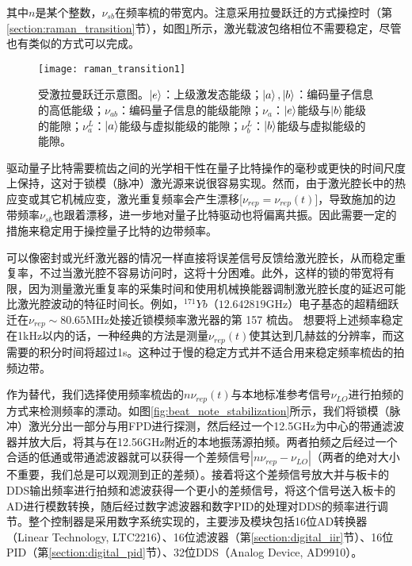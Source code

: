 其中$n$是某个整数，$\nu_{sb}$在频率梳的带宽内。注意采用拉曼跃迁的方式操控时（第\ref{section:raman_transition}节），如图\ref{fig:raman_transition1}所示，激光载波包络相位不需要稳定\cite[]{Peer_Shapiro_Stowe_Shapiro_Ye_2007}，尽管也有类似的方式可以完成\cite[]{Koke_Grebing_Frei_Anderson_Assion_Steinmeyer_2010}。

\begin{figure}
    \centering
    \caption[受激拉曼跃迁示意图]{受激拉曼跃迁示意图。$\ket{e}$：上级激发态能级；$\ket{a},\ket{b}$：编码量子信息的高低能级；$\nu_{ab}$：编码量子信息的能级能隙；$\nu_{a}$：$\ket{e}$能级与$\ket{b}$能级的能隙；$\nu_a^L$：$\ket{a}$能级与虚拟能级的能隙；$\nu_b^L$：$\ket{b}$能级与虚拟能级的能隙。\label{fig:raman_transition1}}
    \texttt{[image: raman\_transition1]}
\end{figure}

驱动量子比特需要梳齿之间的光学相干性在量子比特操作的毫秒或更快的时间尺度上保持，这对于锁模（脉冲）激光源来说很容易实现\cite[]{Hayes_Matsukevich_Maunz_Hucul_Quraishi_Olmschenk_Campbell_Mizrahi_Senko_Monroe_2010}。然而，由于激光腔长中的热应变或其它机械应变，激光重复频率会产生漂移[$\nu_{rep}=\nu_{rep}(t)$]，导致施加的边带频率$\nu_{sb}$也跟着漂移，进一步地对量子比特驱动也将偏离共振。因此需要一定的措施来稳定用于操控量子比特的边带频率。

可以像密封或光纤激光器的情况一样直接将误差信号反馈给激光腔长，从而稳定重复率，不过当激光腔不容易访问时，这将十分困难。此外，这样的锁的带宽将有限，因为测量激光重复率的采集时间和使用机械换能器调制激光腔长度的延迟可能比激光腔波动的特征时间长。例如，$^{171}Yb$（$12.642819 $GHz）电子基态的超精细跃迁在$ \nu_{rep} \sim 80.65$MHz处接近锁模频率激光器的第 157 梳齿。
想要将上述频率稳定在1kHz以内的话，一种经典的方法是测量$\nu_{rep}(t)$使其达到几赫兹的分辨率，而这需要的积分时间将超过1s。这种过于慢的稳定方式并不适合用来稳定频率梳齿的拍频边带。

作为替代，我们选择使用频率梳齿的$n\nu_{rep}(t)$与本地标准参考信号$\nu_{LO}$进行拍频的方式来检测频率的漂动。如图\ref{fig:beat_note_stabilization}所示，我们将锁模（脉冲）激光分出一部分与用FPD进行探测，然后经过一个12.5GHz为中心的带通滤波器并放大后，将其与在12.56GHz附近的本地振荡源拍频。两者拍频之后经过一个合适的低通或带通滤波器就可以获得一个差频信号$|n\nu_{rep}-\nu_{LO}|$（两者的绝对大小不重要，我们总是可以观测到正的差频）。接着将这个差频信号放大并与板卡的DDS输出频率进行拍频和滤波获得一个更小的差频信号，将这个信号送入板卡的AD进行模数转换，随后经过数字滤波器和数字PID的处理对DDS的频率进行调节。整个控制器是采用数字系统实现的，主要涉及模块包括16位AD转换器（Linear Technology, LTC2216）、16位滤波器（第\ref{section:digital_iir}节）、16位PID（第\ref{section:digital_pid}节）、32位DDS（Analog Device, AD9910）。






